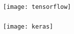 








\begin{frame}[fragile] \frametitle{}

\texttt{[image: tensorflow]}

\end{frame}







\begin{frame}[fragile] \frametitle{}

\texttt{[image: keras]}

\end{frame}


